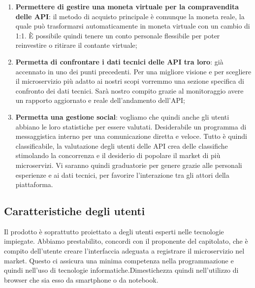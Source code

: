 \documentclass[12pt,a4paper,titlepage]{article}
\begin{document}
\begin{enumerate}
		\item \textbf{Permettere di gestire una moneta virtuale per la compravendita delle API}: il metodo di acquisto principale è comunque la moneta reale, la quale può trasformarsi automaticamente in moneta virtuale con un cambio di 1:1. È possibile quindi tenere un conto personale flessibile per poter reinvestire o ritirare il contante virtuale;
		\item \textbf{Permetta di confrontare i dati tecnici delle API tra loro}: già accennato in uno dei punti precedenti. Per una migliore visione e per scegliere il microservizio più adatto ai nostri scopi vorremmo una sezione specifica di confronto dei dati tecnici. Sarà nostro compito grazie al monitoraggio avere un rapporto aggiornato e reale dell'andamento dell'API;
		\item \textbf{Permetta una gestione social}: vogliamo che quindi anche gli utenti abbiano le loro statistiche per essere valutati. Desiderabile un programma di messaggistica interno per una comunicazione diretta e veloce. Tutto è quindi classificabile, la valutazione degli utenti delle API crea delle classifiche stimolando la concorrenza e il desiderio di popolare il market di più microservizi. Vi saranno quindi graduatorie per genere grazie alle personali esperienze e ai dati tecnici, per favorire l'interazione tra gli attori della piattaforma.
	\end{enumerate}
	
	\subsection{Caratteristiche degli utenti}
	Il prodotto è soprattutto proiettato a degli utenti esperti nelle tecnologie impiegate. Abbiamo prestabilito, concordi con il proponente del capitolato, che è compito dell'utente creare l'interfaccia adeguata a registrare il microservizio nel market. Questo ci assicura una minima competenza nella programmazione e quindi nell'uso di tecnologie informatiche.Dimestichezza quindi nell'utilizzo di browser che sia esso da smartphone o da notebook. 
	
\end{document}

